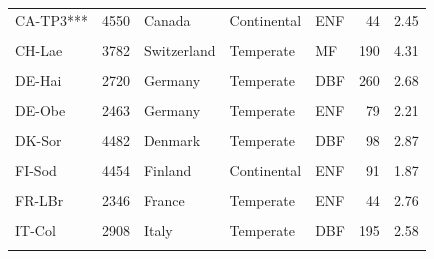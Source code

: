 \begin{table}[!h]
\begin{tabular}[t]{lrlllrr}
CA-TP3*** & 4550 & Canada & Continental & ENF & 44 & 2.45\\
\cellcolor{gray!10}{CA-TPD} & \cellcolor{gray!10}{1082} & \cellcolor{gray!10}{Canada} & \cellcolor{gray!10}{Continental} & \cellcolor{gray!10}{DBF} & \cellcolor{gray!10}{100} & \cellcolor{gray!10}{2.31}\\
\addlinespace
CH-Lae & 3782 & Switzerland & Temperate & MF & 190 & 4.31\\
\cellcolor{gray!10}{CZ-BK1} & \cellcolor{gray!10}{3920} & \cellcolor{gray!10}{Czechia} & \cellcolor{gray!10}{Continental} & \cellcolor{gray!10}{ENF} & \cellcolor{gray!10}{37} & \cellcolor{gray!10}{1.73}\\
DE-Hai & 2720 & Germany & Temperate & DBF & 260 & 2.68\\
\cellcolor{gray!10}{DE-Lnf***} & \cellcolor{gray!10}{2670} & \cellcolor{gray!10}{Germany} & \cellcolor{gray!10}{Temperate} & \cellcolor{gray!10}{DBF} & \cellcolor{gray!10}{122} & \cellcolor{gray!10}{2.60}\\
DE-Obe & 2463 & Germany & Temperate & ENF & 79 & 2.21\\
\addlinespace
\cellcolor{gray!10}{DE-Tha} & \cellcolor{gray!10}{4502} & \cellcolor{gray!10}{Germany} & \cellcolor{gray!10}{Temperate} & \cellcolor{gray!10}{ENF} & \cellcolor{gray!10}{131} & \cellcolor{gray!10}{2.14}\\
DK-Sor & 4482 & Denmark & Temperate & DBF & 98 & 2.87\\
\cellcolor{gray!10}{FI-Hyy} & \cellcolor{gray!10}{4466} & \cellcolor{gray!10}{Finland} & \cellcolor{gray!10}{Continental} & \cellcolor{gray!10}{ENF} & \cellcolor{gray!10}{59} & \cellcolor{gray!10}{2.15}\\
FI-Sod & 4454 & Finland & Continental & ENF & 91 & 1.87\\
\cellcolor{gray!10}{FR-Fon} & \cellcolor{gray!10}{3586} & \cellcolor{gray!10}{France} & \cellcolor{gray!10}{Temperate} & \cellcolor{gray!10}{DBF} & \cellcolor{gray!10}{166} & \cellcolor{gray!10}{3.64}\\
\addlinespace
FR-LBr & 2346 & France & Temperate & ENF & 44 & 2.76\\
\cellcolor{gray!10}{FR-Pue} & \cellcolor{gray!10}{4550} & \cellcolor{gray!10}{France} & \cellcolor{gray!10}{Temperate} & \cellcolor{gray!10}{EBF} & \cellcolor{gray!10}{73} & \cellcolor{gray!10}{1.86}\\
IT-Col & 2908 & Italy & Temperate & DBF & 195 & 2.58\\
\cellcolor{gray!10}{IT-Cp2} & \cellcolor{gray!10}{1082} & \cellcolor{gray!10}{Italy} & \cellcolor{gray!10}{Temperate} & \cellcolor{gray!10}{EBF} & \cellcolor{gray!10}{65} & \cellcolor{gray!10}{2.38}\\

\end{tabular}
\end{table}
